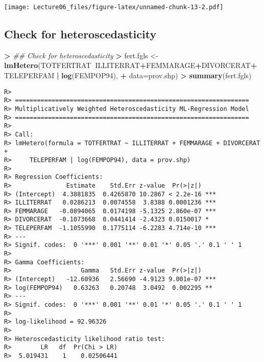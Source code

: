 \documentclass[
]{article}
\newenvironment{Shaded}{\begin{snugshade}}{\end{snugshade}}
\newcommand{\CommentTok}[1]{\textcolor[rgb]{0.56,0.35,0.01}{\textit{#1}}}
\newcommand{\DataTypeTok}[1]{\textcolor[rgb]{0.13,0.29,0.53}{#1}}
\newcommand{\DecValTok}[1]{\textcolor[rgb]{0.00,0.00,0.81}{#1}}
\newcommand{\ErrorTok}[1]{\textcolor[rgb]{0.64,0.00,0.00}{\textbf{#1}}}
\newcommand{\KeywordTok}[1]{\textcolor[rgb]{0.13,0.29,0.53}{\textbf{#1}}}
\newcommand{\NormalTok}[1]{#1}
\newcommand{\OperatorTok}[1]{\textcolor[rgb]{0.81,0.36,0.00}{\textbf{#1}}}
\newcommand{\StringTok}[1]{\textcolor[rgb]{0.31,0.60,0.02}{#1}}
\begin{document}
\begin{Shaded}
\end{Shaded}

\texttt{[image: Lecture06\_files/figure-latex/unnamed-chunk-13-2.pdf]}

\hypertarget{check-for-heteroscedasticity}{%
\subsection{Check for
heteroscedasticity}\label{check-for-heteroscedasticity}}

\begin{Shaded}
\begin{Highlighting}[]
\OperatorTok{>}\StringTok{ }\CommentTok{## Check for heteroscedasticity}
\ErrorTok{>}\StringTok{ }\NormalTok{fert.fgls <-}\StringTok{ }\KeywordTok{lmHetero}\NormalTok{(TOTFERTRAT}\OperatorTok{~}\NormalTok{ILLITERRAT}\OperatorTok{+}\NormalTok{FEMMARAGE}\OperatorTok{+}\NormalTok{DIVORCERAT}\OperatorTok{+}\NormalTok{TELEPERFAM }\OperatorTok{|}\StringTok{ }\KeywordTok{log}\NormalTok{(FEMPOP94),}
\OperatorTok{+}\StringTok{                       }\DataTypeTok{data=}\NormalTok{prov.shp)}
\OperatorTok{>}\StringTok{ }\KeywordTok{summary}\NormalTok{(fert.fgls)}
\end{Highlighting}
\end{Shaded}

\begin{verbatim}
R> 
R> ================================================================
R> Multiplicatively Weighted Heteroscedasticity ML-Regression Model
R> ================================================================
R> 
R> Call:
R> lmHetero(formula = TOTFERTRAT ~ ILLITERRAT + FEMMARAGE + DIVORCERAT + 
R>     TELEPERFAM | log(FEMPOP94), data = prov.shp)
R> 
R> Regression Coefficients:
R>               Estimate    Std.Err z-value  Pr(>|z|)    
R> (Intercept)  4.3881835  0.4265870 10.2867 < 2.2e-16 ***
R> ILLITERRAT   0.0286213  0.0074558  3.8388 0.0001236 ***
R> FEMMARAGE   -0.0894065  0.0174198 -5.1325 2.860e-07 ***
R> DIVORCERAT  -0.1073668  0.0441414 -2.4323 0.0150017 *  
R> TELEPERFAM  -1.1055990  0.1775114 -6.2283 4.714e-10 ***
R> ---
R> Signif. codes:  0 '***' 0.001 '**' 0.01 '*' 0.05 '.' 0.1 ' ' 1
R> 
R> Gamma Coefficients:
R>                   Gamma   Std.Err z-value  Pr(>|z|)    
R> (Intercept)   -12.60936   2.56690 -4.9123 9.001e-07 ***
R> log(FEMPOP94)   0.63263   0.20748  3.0492  0.002295 ** 
R> ---
R> Signif. codes:  0 '***' 0.001 '**' 0.01 '*' 0.05 '.' 0.1 ' ' 1
R> 
R> log-likelihood = 92.96326 
R> 
R> Heteroscedasticity likelihood ratio test:
R>        LR   df  Pr(Chi > LR)
R>  5.019431    1    0.02506441
\end{verbatim}
\end{document}
